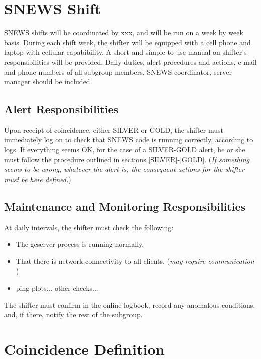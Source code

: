 \documentclass{article}
\begin{document}
\section{SNEWS Shift}

SNEWS shifts will be coordinated by xxx, and will be run on
a week by week basis.  During each shift week, the shifter will
be equipped with a cell phone and laptop with cellular
capabibility. A short and simple to use manual on shifter's 
responsibilities will be provided. Daily duties, alert procedures and
actions, e-mail and phone numbers of all subgroup members, SNEWS
coordinator, server manager should be included.

\subsection{Alert Responsibilities}

Upon receipt of coincidence, either SILVER or GOLD, the shifter
must immediately log on to check that SNEWS code is running
correctly, according to logs.  If everything seems OK, for 
the case of a SILVER-GOLD  alert, he or she must follow the procedure
outlined in sections \ref{SILVER}-\ref{GOLD}.
({\it If something seems to be wrong, whatever the alert is, the consequent  
actions for the shifter must be here defined.})

\subsection{Maintenance and Monitoring Responsibilities}

At daily intervals, the shifter must check the following:

\begin{itemize}
\item The gcserver process is running normally.
\item That there is network connectivity to all clients. ({\it may
require communication })
\item ping plots... other checks...

\end{itemize}

The shifter must confirm in the online logbook, record any
anomalous conditions, and, if there, notify the rest of the subgroup.



\section{Coincidence Definition}
\end{document}
